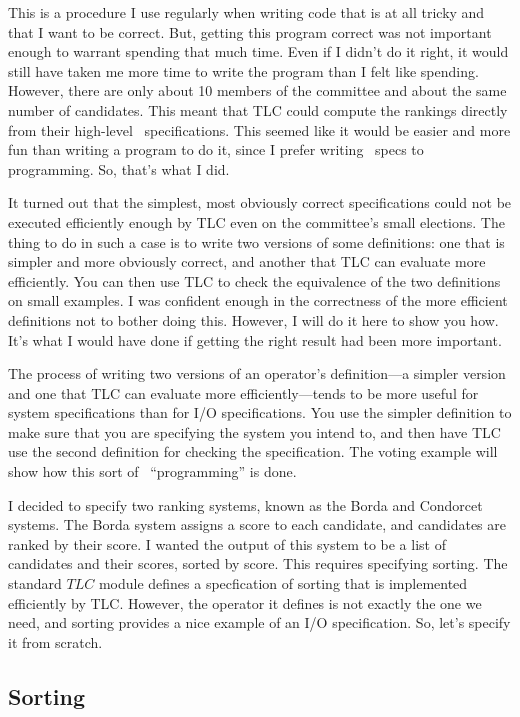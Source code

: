 \documentclass[fleqn,leqno]{article}
\begin{document}
This is a procedure I use regularly when writing code that is at all
tricky and that I want to be correct.  But, getting this program
correct was not important enough to warrant spending that much time.
Even if I didn't do it right, it would still have taken me more time
to write the program than I felt like spending.  However, there are
only about 10 members of the committee and about the same number of
candidates.  This meant that TLC could compute the rankings directly
from their high-level \tlaplus\ specifications.  This seemed like it
would be easier and more fun than writing a program to do it, since I
prefer writing \tlaplus\ specs to programming.  So, that's what I did.

It turned out that the simplest, most obviously correct specifications
could not be executed efficiently enough by TLC even on the
committee's small elections.  The thing to do in such a case is to
write two versions of some definitions: one that is simpler and more
obviously correct, and another that TLC can evaluate more efficiently.
You can then use TLC to check the equivalence of the two definitions
on small examples.  I was confident enough in the correctness of the
more efficient definitions not to bother doing this.  However, I will
do it here to show you how.  It's what I would have done if getting
the right result had been more important.

The process of writing two versions of an operator's definition---a
simpler version and one that TLC can evaluate more efficiently---tends
to be more useful for system specifications than for I/O
specifications.  You use the simpler definition to make sure that you
are specifying the system you intend to, and then have TLC use the
second definition for checking the specification.  The voting example
will show how this sort of \tlaplus\ ``programming'' is done.

\medskip

I decided to specify two ranking systems, known as the Borda and
Condorcet systems. The Borda system assigns a score to each candidate,
and candidates are ranked by their score. I wanted the output of this
system to be a list of candidates and their scores, sorted by score.
This requires specifying sorting. The standard $TLC$ module defines a
specfication of sorting that is implemented efficiently by TLC\@.
However, the operator it defines is not exactly the one we need, and
sorting provides a nice example of an I/O specification. So, let's
specify it from scratch.

\subsection[Sorting]{Sorting%
  } 
\end{document}
